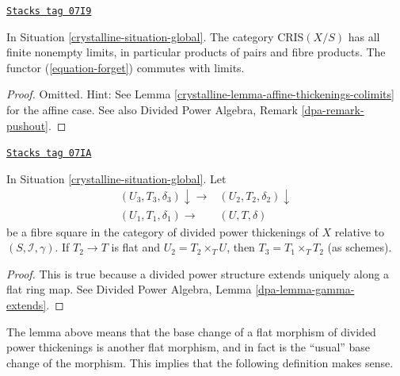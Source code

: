 \begin{lemma}
\label{crystalline-lemma-divided-power-thickening-fibre-products}
\href{https://stacks.math.columbia.edu/tag/07I9}{\texttt{Stacks tag 07I9}}

In Situation \ref{crystalline-situation-global}.
The category $\text{CRIS}(X/S)$ has all finite nonempty limits,
in particular products of pairs and fibre products.
The functor (\ref{equation-forget}) commutes with limits.
\end{lemma}

\begin{proof}

Omitted. Hint: See Lemma \ref{crystalline-lemma-affine-thickenings-colimits}
for the affine case. See also
Divided Power Algebra, Remark \ref{dpa-remark-pushout}.
\end{proof}

\begin{lemma}
\label{crystalline-lemma-divided-power-thickening-base-change-flat}
\href{https://stacks.math.columbia.edu/tag/07IA}{\texttt{Stacks tag 07IA}}

In Situation \ref{crystalline-situation-global}. Let
$$
\begin{array}{cc}(U_3, T_3, \delta_3) \downarrow\longrightarrow & (U_2, T_2, \delta_2) \downarrow \\ (U_1, T_1, \delta_1) \longrightarrow & (U, T, \delta)\end{array}
$$
be a fibre square in the category of divided power thickenings of
$X$ relative to $(S, \mathcal{I}, \gamma)$. If $T_2 \to T$ is
flat and $U_2 = T_2 \times_T U$, then $T_3 = T_1 \times_T T_2$ (as schemes).
\end{lemma}

\begin{proof}
This is true because a divided power structure extends uniquely
along a flat ring map. See
Divided Power Algebra, Lemma \ref{dpa-lemma-gamma-extends}.
\end{proof}

The lemma above means that the base change of a flat morphism
of divided power thickenings is another flat morphism, and in
fact is the ``usual'' base change of the morphism. This implies
that the following definition makes sense.

